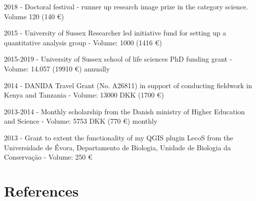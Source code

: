 \documentclass[12pt,a4paper,serif]{moderncv}        %
\begin{document}
\begin{bibenum}
    \item[] 2018 - Doctoral festival - runner up research image prize in the category science. Volume 120 \textsterling \hspace{1pt} (140 \euro )
    \item[] 2015 - University of Sussex Researcher led initiative fund for setting up a quantitative analysis group - Volume: 1000  \textsterling \hspace{1pt} (1416 \euro )
    \item[] 2015-2019 - University of Sussex school of life sciences PhD funding grant - Volume: 14.057 \textsterling \hspace{1pt} (19910 \euro) annually 
    \item[] 2014 - DANIDA Travel Grant (No. A26811) in support of conducting fieldwork in Kenya and Tanzania - Volume: 13000 DKK (1700 \euro)
    \item[] 2013-2014 - Monthly scholarship from the Danish ministry of Higher Education and Science - Volume: 5753 DKK (770 \euro) monthly
    \item[] 2013 - Grant to extent the functionality of my QGIS plugin LecoS from the Universidade de \'{E}vora, Departamento de Biologia, Unidade de Biologia da Conserva\c{c}\"{a}o  - Volume: 250 \euro

\end{bibenum}

\vspace{8pt}
\section{References}

\vspace{6pt}
 

\end{document}
